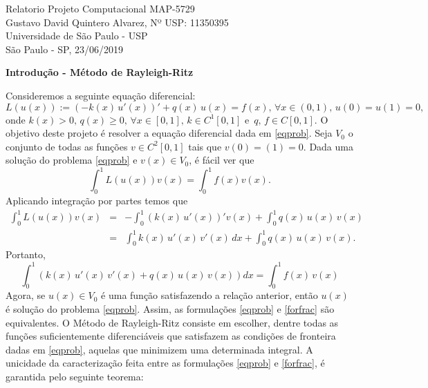 \documentclass[12pt,a4paper]{report}
\newcommand{\dis}{\displaystyle}
\begin{document}
\begin{center}
{\LARGE Relatorio Projeto Computacional MAP-5729}\medskip\\
\large{Gustavo David Quintero Alvarez, Nº USP: 11350395\\
Universidade de São Paulo - USP\\
São Paulo - SP, 23/06/2019}
\end{center}\vspace*{1cm}
\begin{flushleft}
\textbf{Introdução - Método de Rayleigh-Ritz}
\end{flushleft}
Consideremos a seguinte equação diferencial:
\begin{equation}\label{eqprob}
L(u(x)):=\left(-k(x)\,u'(x)\right)' + q(x)\,u(x) = f(x),\, \forall x\in (0,1),\, u(0)=u(1)=0,
\end{equation}
onde $k(x)>0,\, q(x)\geq 0,\,\forall x\in [0,1],\,k\in C^1[0,1]$ e $\,q,\,f\in C[0,1]$. O objetivo deste projeto é resolver a equação diferencial dada em \eqref{eqprob}. Seja $V_0$ o conjunto de todas as funções $v\in C^2[0,1]$ tais que $v(0)=(1)=0$. Dada uma solução do problema \eqref{eqprob} e $v(x)\in V_0$, é fácil ver que $$\dis\int_0^1 L(u(x))v(x)=\dis\int_0^1f(x)v(x).$$ Aplicando integração por partes temos que 
\begin{eqnarray*}
\dis\int_0^1 L(u(x))v(x) &=& -\dis\int_0^1(k(x)\,u'(x))'v(x) + \dis\int_0^1 q(x)\,u(x)\,v(x)  \\
&=& \dis\int_0^1 k(x)\,u'(x)\,v'(x)\,dx + \dis\int_0^1 q(x)\,u(x)\,v(x).
\end{eqnarray*}
Portanto,
\begin{equation}\label{forfrac}
\dis\int_0^1 \left(k(x)\,u'(x)\,v'(x)+q(x)\,u(x)\,v(x)\right)dx = \dis\int_0^1f(x)\,v(x)
\end{equation}
Agora, se $u(x)\in V_0$ é uma função satisfazendo a relação anterior, então $u(x)$ é solução do problema \eqref{eqprob}. Assim, as formulações \eqref{eqprob} e \eqref{forfrac} são equivalentes.
O Método de Rayleigh-Ritz consiste em escolher, dentre todas as funções suficientemente diferenciáveis que satisfazem as condições de fronteira dadas em \eqref{eqprob}, aquelas que minimizem uma determinada integral. A unicidade da caracterização feita entre as formulações \eqref{eqprob} e \eqref{forfrac}, é garantida pelo seguinte teorema:
\end{document}
